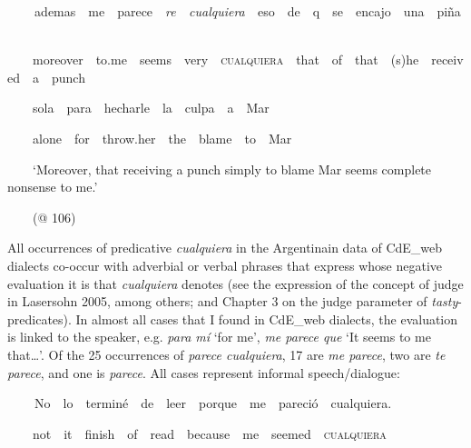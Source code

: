\begin{styleStandard}
\textbf{\ \ }\ \ ademas\ \ me\ \ parece\ \ \textit{re\ \ cualquiera\ \ }eso\ \ de\ \ q\ \ se\ \ encajo\ \ una\ \ piña\ \ 
\end{styleStandard}

\begin{styleStandard}
\ \ \ \ moreover\ \ to.me\ \ seems\ \ very\ \ \textsc{cualquiera\ \ }that\ \ of\ \ that\ \ (s)he\ \ received\ \ a\ \ punch\ \ 
\end{styleStandard}

\begin{styleStandard}
\ \ \ \ sola\ \ para\ \ hecharle\ \ la\ \ culpa\ \ a\ \ Mar
\end{styleStandard}

\begin{styleStandard}
\ \ \ \ alone\ \ for\ \ throw.her\ \ the\ \ blame\ \ to\ \ Mar
\end{styleStandard}

\begin{styleStandard}
\ \ \ \ ‘Moreover, that receiving a punch simply to blame Mar seems complete nonsense to me.’
\end{styleStandard}

\begin{styleStandard}
\ \ \ \ (@ 106)
\end{styleStandard}

\begin{styleStandard}
All occurrences of predicative \textit{cualquiera} in the Argentinain data of CdE\_web dialects co-occur with adverbial or verbal phrases that express whose negative evaluation it is that \textit{cualquiera} denotes (see the expression of the concept of judge in Lasersohn 2005, among others; and Chapter 3 on the judge parameter of \textit{tasty}{}-predicates). In almost all cases that I found in CdE\_web dialects, the evaluation is linked to the speaker, e.g. \textit{para mí} ‘for me’, \textit{me parece que} ‘It seems to me that…’. Of the 25 occurrences of \textit{parece cualquiera}, 17 are \textit{me parece}, two are \textit{te parece}, and one is \textit{parece}. All cases represent informal speech/dialogue:
\end{styleStandard}

\begin{styleStandard}
\textbf{\ \ }\ \ No\ \ lo\ \ terminé\ \ de\ \ leer\ \ porque\ \ me\ \ pareció\ \ cualquiera.
\end{styleStandard}

\begin{styleStandard}
\ \ \ \ not\ \ it\ \ finish\ \ of\ \ read\ \ because\ \ me\ \ seemed\ \ \textsc{cualquiera}
\end{styleStandard}

